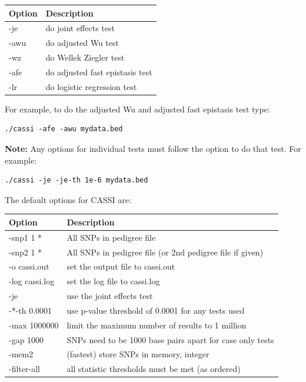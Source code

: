 \documentclass[a4paper,12pt]{article}
\begin{document}
{\begin{center}\begin{tabular}{ll}
Option  & Description\\
\hline
-je  & do joint effects test\\
-awu  & do adjusted Wu test\\
-wz  & do Wellek Ziegler test\\
-afe  & do adjusted fast epistasis test\\
-lr  & do logistic regression test\\
\end{tabular}\end{center}}

For example, to do the adjusted Wu and adjusted fast epistasis test type: 
\vspace{0.35cm} \begin{lstlisting}
./cassi -afe -awu mydata.bed 
\end{lstlisting} \vspace{0.35cm}
{\bf Note:} Any options for individual tests must follow the option to do that test. For example: 
\vspace{0.35cm} \begin{lstlisting}
./cassi -je -je-th 1e-6 mydata.bed

\end{lstlisting} \vspace{0.35cm}
The default options for CASSI are: 

{\begin{center}\begin{tabular}{ll}
Option  & Description\\
\hline
-snp1 1 *  & All SNPs in pedigree file\\
-snp2 1 *  & All SNPs in pedigree file (or 2nd pedigree file if given)\\
-o cassi.out  & set the output file to cassi.out\\
-log cassi.log  & set the log file to cassi.log\\
-je  & use the joint effects test\\
-*-th 0.0001  & use p-value threshold of 0.0001 for any tests used\\
-max 1000000  & limit the maximum number of results to 1 million\\
-gap 1000  & SNPs need to be 1000 base pairs apart for case only tests\\
-mem2  & (fastest) store SNPs in memory, integer\\
-filter-all  & all statistic thresholds must be met (as ordered)\\
\end{tabular}\end{center}}
\end{document}
